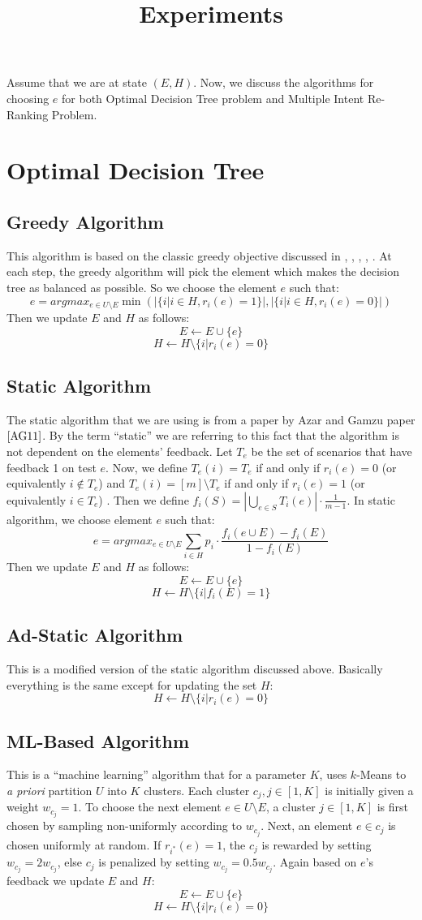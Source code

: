 \documentclass[12pt,epsfig,graphicx,amsmath,color]{article}
\title{Experiments}
\begin{document}
Assume that we are at state $(E,H)$. Now, we discuss the algorithms for choosing $e$ for both Optimal Decision Tree problem and Multiple Intent Re-Ranking Problem.
\section{Optimal Decision Tree}
\subsection{Greedy Algorithm}
This algorithm is based on the classic greedy objective discussed in \cite{KPB99}, \cite{D01}, \cite{AH12}, \cite{CPRAM11}, \cite{GB09}. At each step, the greedy algorithm will pick the element which makes the decision tree as balanced as possible. So we choose the element $e$ such that: 
$$e = argmax_{e\in U\setminus E}\min(|\{i|i\in H, r_i(e)=1\}|,|\{i|i\in H, r_i(e)=0\}|)$$
Then we update $E$ and $H$ as follows:
$$E\leftarrow E\cup \{e\}$$
$$H\leftarrow H \setminus \{i|r_i(e)=0\}$$
\subsection{Static Algorithm}
The static algorithm that we are using is from a paper by Azar and Gamzu paper $\cite{AG11}$. By the term ``static'' we are referring to this fact that the algorithm is not dependent on the elements' feedback. Let $T_e$ be the set of scenarios that have feedback 1 on test $e$. Now, we define $T_e(i)=T_e$ if and only if $r_i(e)=0$ (or equivalently $i\notin T_e$) and $T_e(i)=[m]\setminus T_e$ if and only if  $r_i(e)=1$ (or equivalently $i\in T_e$) . Then we define $f_i(S) =|\bigcup_{e\in S}T_i(e)|\cdot\frac{1}{m-1}$. In static algorithm, we choose element $e$ such that:
$$e = argmax_{e\in U\setminus E} \sum\limits_{i\in H} p_i \cdot \frac{f_i(e\cup E)-f_i(E)}{1-f_i(E)} $$
Then we update $E$ and $H$ as follows:
$$E\leftarrow E\cup \{e\}$$
$$H\leftarrow H \setminus \{i|f_i(E)=1\}$$
\subsection{Ad-Static Algorithm}
This is a modified version of the static algorithm discussed above. Basically everything is the same except for updating the set $H$:
$$H\leftarrow H \setminus \{i|r_i(e)=0\}$$
\subsection{ML-Based Algorithm}
This is a ``machine learning'' algorithm that for a parameter $K$, uses $k$-Means \cite{arthur2007k} to \textit{a priori} partition $U$ into $K$ clusters. Each cluster $c_j, j\in{}[1,K]$ is initially given a weight $w_{c_j} = 1$.
To choose the next element $e\in{}U\setminus{}E$, a cluster $j\in{}[1,K]$ is
first chosen by sampling non-uniformly according to $w_{c_j}$.
Next, an element $e\in{}c_j$ is chosen uniformly at random.
If $r_{i^*}(e)=1$, the $c_j$ is rewarded by setting $w_{c_j} =
2 w_{c_j}$, else $c_j$ is penalized by setting $w_{c_j} = 0.5 w_{c_j}$. Again based on $e$'s feedback we update $E$ and $H$:
$$E\leftarrow E\cup \{e\}$$
$$H\leftarrow H \setminus \{i|r_i(e)=0\}$$
\end{document}
